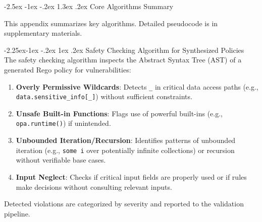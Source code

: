 \documentclass[manuscript,screen,9pt]{acmart}
\makeatletter
\renewcommand\section{\@startsection{section}{1}{\z@}%
  {-2.5ex \@plus -1ex \@minus -.2ex}%
  {1.3ex \@plus.2ex}%
  {\normalfont\Large\bfseries}}
\renewcommand\subsection{\@startsection{subsection}{2}{\z@}%
  {-2.25ex\@plus -1ex \@minus -.2ex}%
  {1ex \@plus .2ex}%
  {\normalfont\large\bfseries}}
\makeatother
\begin{document}
\begin{table}[!htb]
\section{Core Algorithms Summary}
\label{app:algorithms}

This appendix summarizes key algorithms. Detailed pseudocode is in supplementary materials.

\subsection{Safety Checking Algorithm for Synthesized Policies}
The safety checking algorithm inspects the Abstract Syntax Tree (AST) of a generated Rego policy for vulnerabilities:
\begin{enumerate}[leftmargin=*,itemsep=1pt,parsep=1pt]
    \item \textbf{Overly Permissive Wildcards}: Detects \texttt{\_} in critical data access paths (e.g., \texttt{data.sensitive\_info[\_]}) without sufficient constraints.
    \item \textbf{Unsafe Built-in Functions}: Flags use of powerful built-ins (e.g., \texttt{opa.runtime()}) if unintended.
    \item \textbf{Unbounded Iteration/Recursion}: Identifies patterns of unbounded iteration (e.g., \texttt{some i} over potentially infinite collections) or recursion without verifiable base cases.
    \item \textbf{Input Neglect}: Checks if critical input fields are properly used or if rules make decisions without consulting relevant inputs.
\end{enumerate}
Detected violations are categorized by severity and reported to the validation pipeline.


\end{table}
\end{document}
